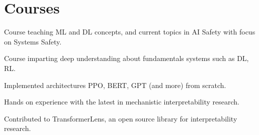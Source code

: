 \documentclass[]{deedy-resume-openfont}
\begin{document}
\begin{minipage}[t]{0.66\textwidth}
\section{Courses}
\begin{tightemize}
\item Course teaching ML and DL concepts, and current topics in AI Safety with focus on Systems Safety.
\end{tightemize}
\sectionsep

\begin{tightemize}
\item Course imparting deep understanding about fundamentals systems such as DL, RL.
\item Implemented architectures PPO, BERT, GPT (and more) from scratch.
\item Hands on experience with the latest in mechanistic interpretability research.
\item Contributed to TransformerLens, an open source library for interpretability research.
\end{tightemize}
\sectionsep

\end{minipage}
\end{document}
